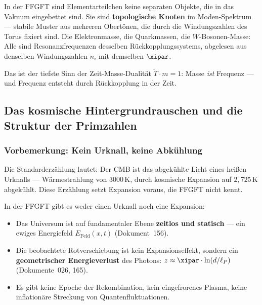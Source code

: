 \begin{interpretation}
In der FFGFT sind Elementarteilchen keine separaten Objekte, die in das Vakuum
eingebettet sind. Sie sind \textbf{topologische Knoten} im Moden-Spektrum —
stabile Muster aus mehreren Obertönen, die durch die Windungszahlen des Torus
fixiert sind. Die Elektronmasse, die Quarkmassen, die $W$-Bosonen-Masse: Alle
sind Resonanzfrequenzen desselben Rückkopplungssystems, abgelesen aus denselben
Windungszahlen $n_i$ mit demselben $\xipar$.

Das ist der tiefste Sinn der Zeit-Masse-Dualität $\tilde{T} \cdot m = 1$:
Masse \emph{ist} Frequenz — und Frequenz entsteht durch Rückkopplung in der Zeit.
\end{interpretation}


\subsection{Das kosmische Hintergrundrauschen und die Struktur der Primzahlen}

\subsubsection*{Vorbemerkung: Kein Urknall, keine Abkühlung}

\begin{important}
Die Standarderzählung lautet: Der CMB ist das abgekühlte Licht eines
heißen Urknalls — Wärmestrahlung von $3000\,\text{K}$, durch kosmische
Expansion auf $2{,}725\,\text{K}$ abgekühlt. Diese Erzählung setzt
Expansion voraus, die FFGFT nicht kennt.

In der FFGFT gibt es weder einen Urknall noch eine Expansion:
\begin{itemize}
    \item Das Universum ist auf fundamentaler Ebene \textbf{zeitlos und statisch}
    — ein ewiges Energiefeld $E_\text{Feld}(x,t)$ (Dokument~156).
    \item Die beobachtete Rotverschiebung ist kein Expansionseffekt, sondern
    ein \textbf{geometrischer Energieverlust} des Photons:
    $z \approx \xipar \cdot \ln(d/\ell_P)$ (Dokumente~026, 165).
    \item Es gibt keine Epoche der Rekombination, kein eingefrorenes Plasma,
    keine inflationäre Streckung von Quantenfluktuationen.
\end{itemize}
\end{important}


